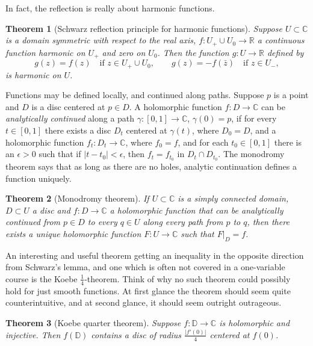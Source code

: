 \documentclass[12pt,openany]{book}
\newcommand{\avoidbreak}{\postdisplaypenalty=100}
\newcommand{\sabs}[1]{\lvert {#1} \rvert}
\newcommand{\C}{{\mathbb{C}}}
\newcommand{\R}{{\mathbb{R}}}
\newcommand{\D}{{\mathbb{D}}}
\theoremstyle{plain}
\newtheorem{thm}{Theorem}[section]
\theoremstyle{remark}
\theoremstyle{definition}
\theoremstyle{exercise}
\theoremstyle{example}
\begin{document}
In fact, the reflection is really about harmonic functions.

\begin{thm}[Schwarz reflection principle for harmonic functions]
Suppose $U \subset \C$ is a domain symmetric with respect to the real axis,
$f \colon U_+ \cup U_0 \to \R$ a continuous function harmonic on $U_+$
and zero on $U_0$.  Then the function $g \colon U \to \R$
defined by
\begin{equation*}
g(z) = f(z) \quad \text{if $z \in U_+ \cup U_0$},
\qquad
g(z) =
-f(\bar{z}) \quad \text{if $z \in U_-$},
\end{equation*}
\avoidbreak
is harmonic on $U$.
\end{thm}

Functions may be defined locally, and continued along paths.
Suppose $p$ is a point and $D$ is a disc centered at $p \in D$.
A holomorphic function $f \colon D \to \C$ can be
\emph{analytically continued}
along a path
$\gamma \colon [0,1] \to \C$, $\gamma(0) = p$,
if for every $t \in [0,1]$ there exists
a disc $D_t$ centered at $\gamma(t)$, where $D_0=D$, and a holomorphic function
$f_t \colon D_t \to \C$, where $f_0 = f$, and for each $t_0 \in [0,1]$ there is an
$\epsilon > 0$ such that if $\sabs{t-t_0} < \epsilon$, then
$f_t = f_{t_0}$
in $D_t \cap D_{t_0}$.  The monodromy theorem says that as long as there are
no holes, analytic continuation defines a function uniquely.

\begin{thm}[Monodromy theorem]
If $U \subset \C$ is a simply connected domain, $D \subset U$ a disc and
$f \colon D \to \C$ a holomorphic function that can be analytically
continued from $p \in D$ to every $q \in U$ along every path from $p$ to $q$, then there exists
a unique holomorphic function $F \colon U \to \C$ such that $F|_D = f$.
\end{thm}

\medskip

An interesting and useful theorem getting an inequality in the opposite
direction from
Schwarz's lemma, and one which is often not covered in a one-variable
course is the Koebe $\frac{1}{4}$-theorem.
Think of why no such theorem could possibly hold for just smooth
functions.  At first glance the theorem should seem quite counterintuitive,
and at second glance, it should seem outright outrageous.

\begin{thm}[Koebe quarter theorem]
Suppose $f \colon \D \to \C$ is holomorphic and injective.  Then
$f(\D)$ contains a disc of radius $\frac{\sabs{f'(0)}}{4}$ centered at $f(0)$.
\end{thm}
\end{document}
